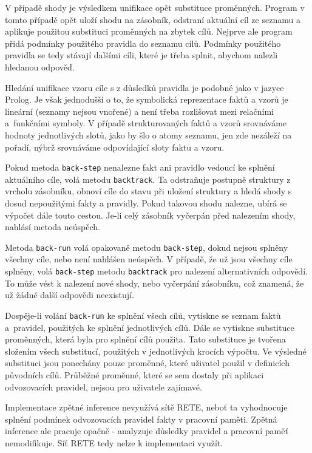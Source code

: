 V případě shody je výsledkem unifikace opět substituce proměnných. Program v
tomto případě opět uloží shodu na zásobník, odstraní aktuální cíl ze seznamu a
aplikuje použitou substituci proměnných na zbytek cílů. Nejprve ale program
přidá podmínky použitého pravidla do seznamu cílů. Podmínky použitého pravidla
se tedy stávají dalšími cíli, které je třeba splnit, abychom nalezli hledanou
odpověď.

Hledání unifikace vzoru cíle s  z důsledků pravidla je
podobné jako v jazyce Prolog. Je však jednodušší o to, že symbolická
reprezentace faktů a vzorů je lineární (seznamy nejsou vnořené) a není třeba
rozlišovat mezi relačními a~funkčními symboly. V případě strukturovaných faktů a
vzorů srovnáváme hodnoty jednotlivých slotů, jako by šlo o atomy seznamu, jen zde
nezáleží na pořadí, nýbrž srovnáváme odpovídající sloty faktu a vzoru.

Pokud metoda \verb|back-step| nenalezne fakt ani pravidlo vedoucí ke splnění
aktuálního cíle, volá metodu \verb|backtrack|. Ta odstraňuje postupně struktury z
vrcholu zásobníku, obnoví cíle do stavu při uložení struktury a hledá shody s
dosud nepoužitými fakty a pravidly. Pokud takovou shodu nalezne, ubírá se
výpočet dále touto cestou. Je-li celý zásobník vyčerpán před nalezením shody,
nahlásí metoda neúspěch.

Metoda \verb|back-run| volá opakovaně metodu \verb|back-step|, dokud nejsou
splněny všechny cíle, nebo není nahlášen neúspěch. V případě, že už jsou všechny
cíle splněny, volá \verb|back-step| metodu \verb|backtrack| pro nalezení
alternativních odpovědí. To může vést k nalezení nové shody, nebo vyčerpání
zásobníku, což znamená, že už žádné další odpovědi neexistují.

Dospěje-li volání \verb|back-run| ke splnění všech cílů, vytiskne se seznam
faktů a~pravidel, použitých ke splnění jednotlivých cílů. Dále se vytiskne
substituce proměnných, která byla pro splnění cílů použita. Tato substituce je
tvořena složením všech substitucí, použitých v jednotlivých krocích výpočtu. Ve
výsledné substituci jsou ponechány pouze proměnné, které uživatel použil v
definicích původních cílů. Průběžné proměnné, které se sem dostaly při aplikaci
odvozovacích pravidel, nejsou pro uživatele zajímavé.

Implementace zpětné inference nevyužívá sítě RETE, neboť ta vyhodnocuje splnění
podmínek odvozovacích pravidel fakty v pracovní paměti. Zpětná inference ale
pracuje opačně - analyzuje důsledky pravidel a pracovní paměť nemodifikuje. Síť
RETE tedy nelze k implementaci využít.

